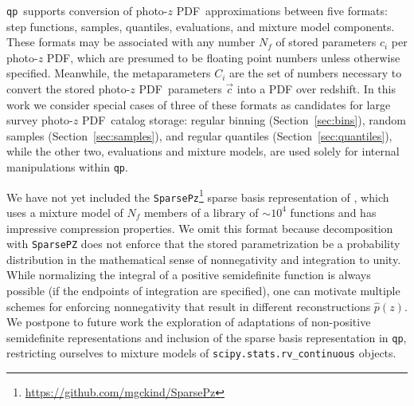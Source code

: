 \documentclass[\docopts]{\docclass}
\newcommand{\qp}{\texttt{qp}}
\newcommand{\pz}{photo-$z$ PDF}
\begin{document}
\qp\ supports conversion of \pz\ approximations between five formats: step 
functions, samples, quantiles, evaluations, and mixture model components.
These formats may be associated with any number $N_{f}$ of stored parameters 
$c_{i}$ per \pz, which are presumed to be floating point numbers unless 
otherwise specified.
Meanwhile, the metaparameters $C_{i}$ are the set of numbers necessary to 
convert the stored \pz\ parameters $\vec{c}$ into a PDF over redshift.
In this work we consider special cases of three of these formats as candidates 
for large survey \pz\ catalog storage: regular binning 
(Section~\ref{sec:bins}), random samples (Section~\ref{sec:samples}), and 
regular quantiles (Section~\ref{sec:quantiles}), while the other two, 
evaluations and mixture models, are used solely for internal manipulations 
within \qp.

We have not yet included the 
\texttt{SparsePz}\footnote{\url{https://github.com/mgckind/SparsePz}} sparse 
basis representation of \citet{carrasco_kind_sparse_2014}, which uses a mixture 
model of $N_{f}$ members of a library of $\sim10^{4}$ functions and has 
impressive compression properties.
We omit this format because decomposition with \texttt{SparsePZ} does not 
enforce that the stored parametrization be a probability distribution in the 
mathematical sense of nonnegativity and integration to unity.
While normalizing the integral of a positive semidefinite function is always 
possible (if the endpoints of integration are specified), one can motivate 
multiple schemes for enforcing nonnegativity that result in different 
reconstructions $\hat{p}(z)$.
We postpone to future work the exploration of adaptations of non-positive 
semidefinite representations and inclusion of the sparse basis representation 
in \qp, restricting ourselves to mixture models of 
\texttt{scipy.stats.rv\_continuous} objects.
\end{document}
